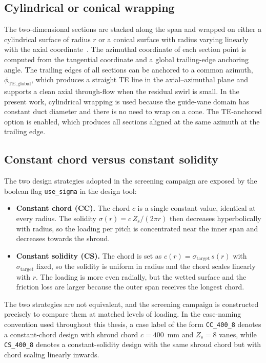 \subsection{Cylindrical or conical wrapping}
\label{sec:theory_wrapping}
 
The two-dimensional sections are stacked along the span and wrapped on either a cylindrical surface of radius $r$ or a conical surface with radius varying linearly with the axial coordinate~\cite{Leonsen2025}. The azimuthal coordinate of each section point is computed from the tangential coordinate and a global trailing-edge anchoring angle. The trailing edges of all sections can be anchored to a common azimuth, $\phi_{\mathrm{TE,global}}$, which produces a straight TE line in the axial--azimuthal plane and supports a clean axial through-flow when the residual swirl is small. In the present work, cylindrical wrapping is used because the guide-vane domain has constant duct diameter and there is no need to wrap on a cone. The TE-anchored option is enabled, which produces all sections aligned at the same azimuth at the trailing edge.
 
\subsection{Constant chord versus constant solidity}
\label{sec:theory_const_chord_const_sol}
 
The two design strategies adopted in the screening campaign are exposed by the boolean flag \texttt{use\_sigma} in the design tool:
\begin{itemize}
  \item \textbf{Constant chord (CC).} The chord $c$ is a single constant value, identical at every radius. The solidity $\sigma(r) = c\,Z_s/(2\pi r)$ then decreases hyperbolically with radius, so the loading per pitch is concentrated near the inner span and decreases towards the shroud.
  \item \textbf{Constant solidity (CS).} The chord is set as $c(r) = \sigma_{\mathrm{target}}\,s(r)$ with $\sigma_{\mathrm{target}}$ fixed, so the solidity is uniform in radius and the chord scales linearly with $r$. The loading is more even radially, but the wetted surface and the friction loss are larger because the outer span receives the longest chord.
\end{itemize}
The two strategies are not equivalent, and the screening campaign is constructed precisely to compare them at matched levels of loading. In the case-naming convention used throughout this thesis, a case label of the form \texttt{CC\_400\_8} denotes a constant-chord design with shroud chord $c = 400$~mm and $Z_s = 8$ vanes, while \texttt{CS\_400\_8} denotes a constant-solidity design with the same shroud chord but with chord scaling linearly inwards.
 
